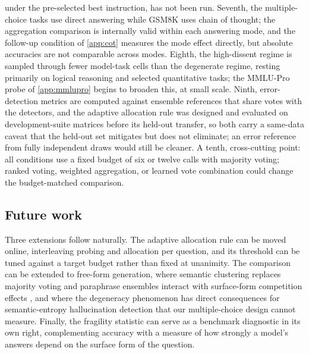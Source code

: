 under the pre-selected best instruction, has not been run. Seventh, the multiple-choice tasks use direct answering while GSM8K uses chain of thought; the aggregation comparison is internally valid within each answering mode, and the follow-up condition of \ref{app:cot} measures the mode effect directly, but absolute accuracies are not comparable across modes. Eighth, the high-dissent regime is sampled through fewer model-task cells than the degenerate regime, resting primarily on logical reasoning and selected quantitative tasks; the MMLU-Pro probe of \ref{app:mmlupro} begins to broaden this, at small scale. Ninth, error-detection metrics are computed against ensemble references that share votes with the detectors, and the adaptive allocation rule was designed and evaluated on development-suite matrices before its held-out transfer, so both carry a same-data caveat that the held-out set mitigates but does not eliminate; an error reference from fully independent draws would still be cleaner. A tenth, cross-cutting point: all conditions use a fixed budget of six or twelve calls with majority voting; ranked voting, weighted aggregation, or learned vote combination could change the budget-matched comparison.

\subsection{Future work}

Three extensions follow naturally. The adaptive allocation rule can be moved online, interleaving probing and allocation per question, and its threshold can be tuned against a target budget rather than fixed at unanimity. The comparison can be extended to free-form generation, where semantic clustering replaces majority voting and paraphrase ensembles interact with surface-form competition effects \citep{holtzman2021surface}, and where the degeneracy phenomenon has direct consequences for semantic-entropy hallucination detection that our multiple-choice design cannot measure. Finally, the fragility statistic can serve as a benchmark diagnostic in its own right, complementing accuracy with a measure of how strongly a model's answers depend on the surface form of the question.

